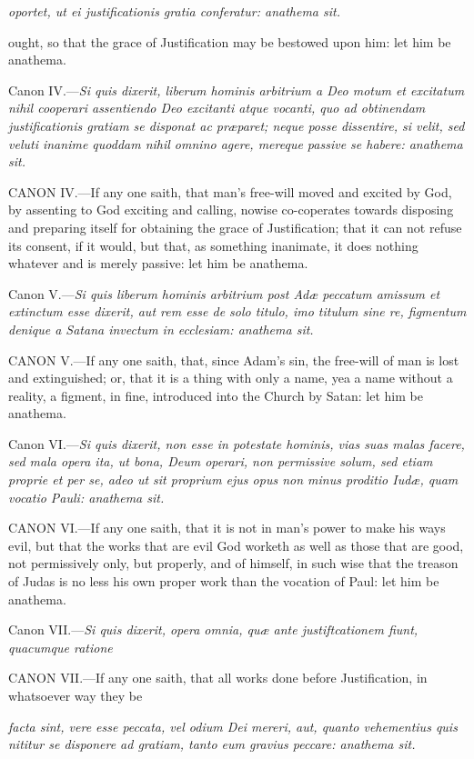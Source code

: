 \emph{oportet, ut ei justificationis gratia conferatur: anathema sit.}

ought, so that the grace of Justification may be bestowed upon him: let him be anathema.

Canon IV.—\emph{Si quis dixerit, liberum hominis arbitrium a Deo motum et excitatum nihil cooperari assentiendo Deo excitanti atque vocanti, quo ad obtinendam justificationis gratiam se disponat ac præparet; neque posse dissentire, si velit, sed veluti inanime quoddam nihil omnino agere, mereque passive se habere: anathema sit.}

CANON IV.—If any one saith, that man's free-will moved and excited by God, by assenting to God exciting and calling, nowise co-coperates towards disposing and preparing itself for obtaining the grace of Justification; that it can not refuse its consent, if it would, but that, as something inanimate, it does nothing whatever and is merely passive: let him be anathema.

Canon V.—\emph{Si quis liberum hominis arbitrium post Adæ peccatum amissum et extinctum esse dixerit, aut rem esse de solo titulo, imo titulum sine re, figmentum denique a Satana invectum in ecclesiam: anathema sit.}

CANON V.—If any one saith, that, since Adam's sin, the free-will of man is lost and extinguished; or, that it is a thing with only a name, yea a name without a reality, a figment, in fine, introduced into the Church by Satan: let him be anathema.

Canon VI.—\emph{Si quis dixerit, non esse in potestate hominis, vias suas malas facere, sed mala opera ita, ut bona, Deum operari, non permissive solum, sed etiam proprie et per se, adeo ut sit proprium ejus opus non minus proditio Iudæ, quam vocatio Pauli: anathema sit.}

CANON VI.—If any one saith, that it is not in man's power to make his ways evil, but that the works that are evil God worketh as well as those that are good, not permissively only, but properly, and of himself, in such wise that the treason of Judas is no less his own proper work than the vocation of Paul: let him be anathema.

Canon VII.—\emph{Si quis dixerit, opera omnia, quæ ante justiftcationem fiunt, quacumque ratione}

CANON VII.—If any one saith, that all works done before Justification, in whatsoever way they be

\emph{facta sint, vere esse peccata, vel odium Dei mereri, aut, quanto vehementius quis nititur se disponere ad gratiam, tanto eum gravius peccare: anathema sit.}


